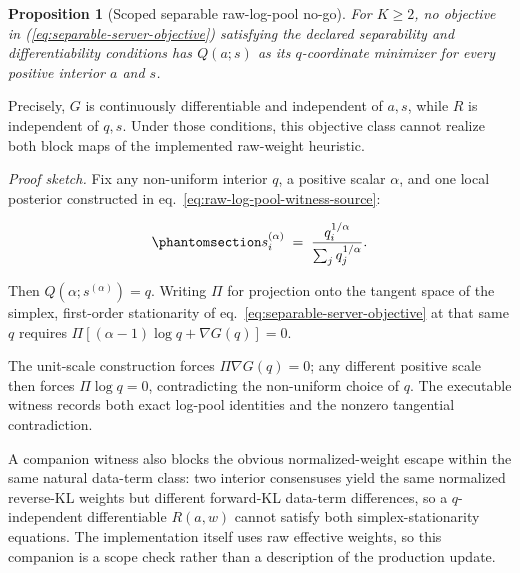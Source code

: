 \documentclass[
  english,
]{article}
\theoremstyle{plain}
\newtheorem{proposition}[theorem]{Proposition}
\theoremstyle{definition}
\theoremstyle{remark}
\theoremstyle{definition}
\begin{document}
\begin{proposition}[Scoped separable raw-log-pool no-go]\label{prop:raw-log-pool-no-go}
For \(K\geq2\), no objective in (\ref{eq:separable-server-objective}) satisfying
the declared separability and differentiability conditions has \(Q(a;s)\) as
its \(q\)-coordinate minimizer for every positive interior \(a\) and \(s\).
\end{proposition}

Precisely, \(G\) is continuously differentiable and independent of
\(a,s\), while \(R\) is independent of \(q,s\). Under those conditions,
this objective class cannot realize both block maps of the implemented
raw-weight heuristic.

\emph{Proof sketch.} Fix any non-uniform interior \(q\), a positive
scalar \(\alpha\), and one local posterior constructed in
eq.~\ref{eq:raw-log-pool-witness-source}:

\begin{equation}\protect\phantomsection\label{eq:raw-log-pool-witness-source}{s_i^{(\alpha)} \;=\;
\frac{q_i^{1/\alpha}}{\sum_j q_j^{1/\alpha}}.}\end{equation}

Then \(Q(\alpha;s^{(\alpha)})=q\). Writing \(\Pi\) for projection onto
the tangent space of the simplex, first-order stationarity of
eq.~\ref{eq:separable-server-objective} at that same \(q\) requires
\(\Pi[(\alpha-1)\log q+\nabla G(q)]=0\).

The unit-scale construction forces \(\Pi\nabla G(q)=0\); any different
positive scale then forces \(\Pi\log q=0\), contradicting the
non-uniform choice of \(q\). The executable witness records both exact
log-pool identities and the nonzero tangential contradiction.

A companion witness also blocks the obvious normalized-weight escape
within the same natural data-term class: two interior consensuses yield
the same normalized reverse-KL weights but different forward-KL
data-term differences, so a \(q\)-independent differentiable \(R(a,w)\)
cannot satisfy both simplex-stationarity equations. The implementation
itself uses raw effective weights, so this companion is a scope check
rather than a description of the production update.
\end{document}
